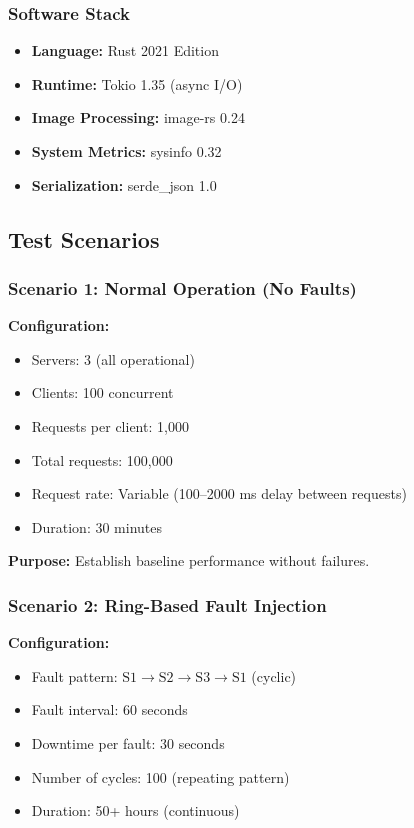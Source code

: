 \documentclass[12pt,a4paper]{article}
\begin{document}
\subsubsection{Software Stack}

\begin{itemize}
    \item \textbf{Language:} Rust 2021 Edition
    \item \textbf{Runtime:} Tokio 1.35 (async I/O)
    \item \textbf{Image Processing:} image-rs 0.24
    \item \textbf{System Metrics:} sysinfo 0.32
    \item \textbf{Serialization:} serde\_json 1.0
\end{itemize}

\subsection{Test Scenarios}

\subsubsection{Scenario 1: Normal Operation (No Faults)}

\textbf{Configuration:}
\begin{itemize}
    \item Servers: 3 (all operational)
    \item Clients: 100 concurrent
    \item Requests per client: 1,000
    \item Total requests: 100,000
    \item Request rate: Variable (100--2000 ms delay between requests)
    \item Duration: 30 minutes
\end{itemize}

\textbf{Purpose:} Establish baseline performance without failures.

\subsubsection{Scenario 2: Ring-Based Fault Injection}

\textbf{Configuration:}
\begin{itemize}
    \item Fault pattern: $\text{S1} \to \text{S2} \to \text{S3} \to \text{S1}$ (cyclic)
    \item Fault interval: 60 seconds
    \item Downtime per fault: 30 seconds
    \item Number of cycles: 100 (repeating pattern)
    \item Duration: 50+ hours (continuous)
\end{itemize}
\end{document}
